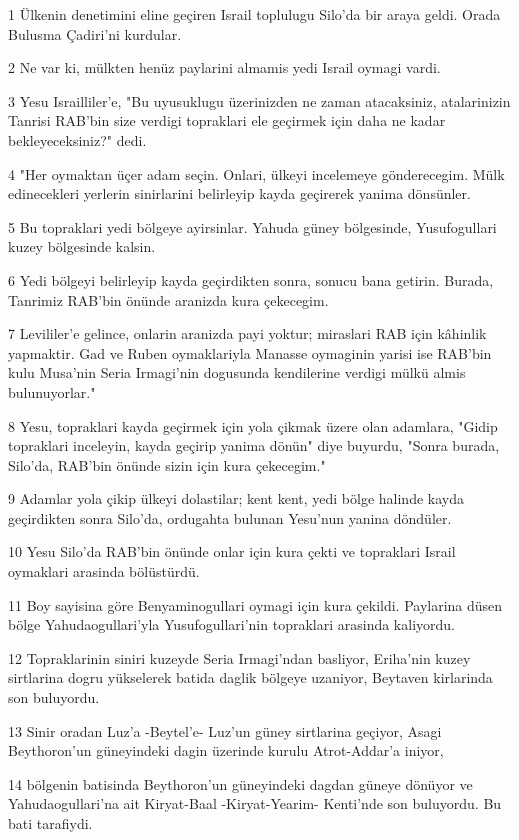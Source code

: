 \par 1 Ülkenin denetimini eline geçiren Israil toplulugu Silo'da bir araya geldi. Orada Bulusma Çadiri'ni kurdular.
\par 2 Ne var ki, mülkten henüz paylarini almamis yedi Israil oymagi vardi.
\par 3 Yesu Israilliler'e, "Bu uyusuklugu üzerinizden ne zaman atacaksiniz, atalarinizin Tanrisi RAB'bin size verdigi topraklari ele geçirmek için daha ne kadar bekleyeceksiniz?" dedi.
\par 4 "Her oymaktan üçer adam seçin. Onlari, ülkeyi incelemeye gönderecegim. Mülk edinecekleri yerlerin sinirlarini belirleyip kayda geçirerek yanima dönsünler.
\par 5 Bu topraklari yedi bölgeye ayirsinlar. Yahuda güney bölgesinde, Yusufogullari kuzey bölgesinde kalsin.
\par 6 Yedi bölgeyi belirleyip kayda geçirdikten sonra, sonucu bana getirin. Burada, Tanrimiz RAB'bin önünde aranizda kura çekecegim.
\par 7 Levililer'e gelince, onlarin aranizda payi yoktur; miraslari RAB için kâhinlik yapmaktir. Gad ve Ruben oymaklariyla Manasse oymaginin yarisi ise RAB'bin kulu Musa'nin Seria Irmagi'nin dogusunda kendilerine verdigi mülkü almis bulunuyorlar."
\par 8 Yesu, topraklari kayda geçirmek için yola çikmak üzere olan adamlara, "Gidip topraklari inceleyin, kayda geçirip yanima dönün" diye buyurdu, "Sonra burada, Silo'da, RAB'bin önünde sizin için kura çekecegim."
\par 9 Adamlar yola çikip ülkeyi dolastilar; kent kent, yedi bölge halinde kayda geçirdikten sonra Silo'da, ordugahta bulunan Yesu'nun yanina döndüler.
\par 10 Yesu Silo'da RAB'bin önünde onlar için kura çekti ve topraklari Israil oymaklari arasinda bölüstürdü.
\par 11 Boy sayisina göre Benyaminogullari oymagi için kura çekildi. Paylarina düsen bölge Yahudaogullari'yla Yusufogullari'nin topraklari arasinda kaliyordu.
\par 12 Topraklarinin siniri kuzeyde Seria Irmagi'ndan basliyor, Eriha'nin kuzey sirtlarina dogru yükselerek batida daglik bölgeye uzaniyor, Beytaven kirlarinda son buluyordu.
\par 13 Sinir oradan Luz'a -Beytel'e- Luz'un güney sirtlarina geçiyor, Asagi Beythoron'un güneyindeki dagin üzerinde kurulu Atrot-Addar'a iniyor,
\par 14 bölgenin batisinda Beythoron'un güneyindeki dagdan güneye dönüyor ve Yahudaogullari'na ait Kiryat-Baal -Kiryat-Yearim- Kenti'nde son buluyordu. Bu bati tarafiydi.

